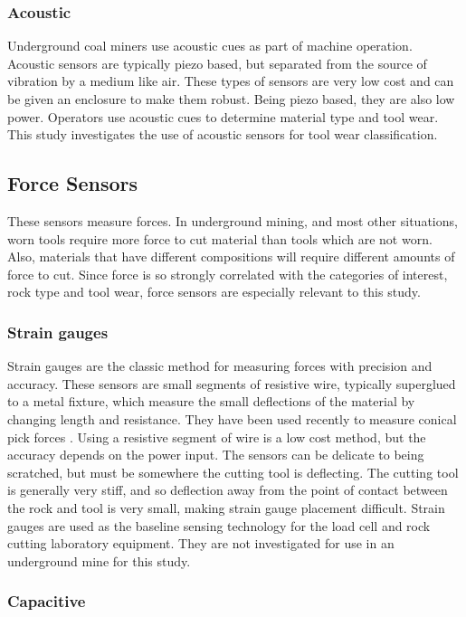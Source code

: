 \subsubsection{Acoustic}
Underground coal miners use acoustic cues as part of machine operation.
Acoustic sensors are typically piezo based, but separated from the source of vibration by a medium like air.
These types of sensors are very low cost and can be given an enclosure to make them robust. 
Being piezo based, they are also low power. 
Operators use acoustic cues to determine material type and tool wear.
This study investigates the use of acoustic sensors for tool wear classification. 

\subsection{Force Sensors}

These sensors measure forces. In underground mining, and most other situations,
worn tools require more force to cut material than tools which are not worn. 
Also, materials that have different compositions will require different amounts of force to cut.
Since force is so strongly correlated with the categories of interest, rock type and tool wear, 
force sensors are especially relevant to this study.

\subsubsection{Strain gauges}
Strain gauges are the classic method for measuring forces with precision and accuracy.
These sensors are small segments of resistive wire, typically superglued to a metal fixture, 
which measure the small deflections of the material by changing length and resistance.
They have been used recently to measure conical pick forces \cite{s23239521}.
Using a resistive segment of wire is a low cost method, but the accuracy depends on the power input.
The sensors can be delicate to being scratched, but must be somewhere the cutting tool is deflecting.
The cutting tool is generally very stiff, and so deflection away from the point of contact between the rock
and tool is very small, making strain gauge placement difficult.
Strain gauges are used as the baseline sensing technology for the load cell and rock cutting laboratory equipment.
They are not investigated for use in an underground mine for this study.

\subsubsection{Capacitive}


